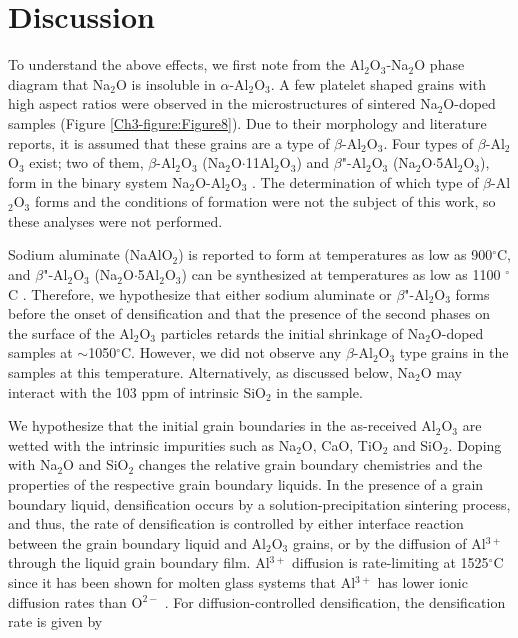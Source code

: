 \section{Discussion}

To understand the above effects, we first note from the Al$_{2}$O$_{3}$-Na$_{2}$O phase diagram \cite{Lambotte2013} that Na$_{2}$O is insoluble in $\alpha$-Al$_{2}$O$_{3}$. A few platelet shaped grains with high aspect ratios were observed in the microstructures of sintered Na$_{2}$O-doped samples (Figure \ref{Ch3-figure:Figure8}). Due to their morphology and literature reports,\cite{Brownmiller1932,PABLOGALAN1959,Rankin1916,Ridgway1936,Duncan1969} it is assumed that these grains are a type of $\beta$-Al$_{2}$O$_{3}$. Four types of $\beta$-Al$_{2}$O$_{3}$ exist; two of them, $\beta$-Al$_{2}$O$_{3}$ (Na$_{2}$O$\cdot$11Al$_{2}$O$_{3}$) and $\beta$"-Al$_{2}$O$_{3}$ (Na$_{2}$O$\cdot$5Al$_{2}$O$_{3}$), form in the binary system Na$_{2}$O-Al$_{2}$O$_{3}$ \cite{Sutorik1998,Stevens1984}. The determination of which type of $\beta$-Al$_{2}$O$_{3}$ forms and the conditions of formation were not the subject of this work, so these analyses were not performed.

Sodium aluminate (NaAlO$_{2}$) is reported to form at temperatures as low as 900$^{\circ}$C,\cite{Christie1978} and $\beta$"-Al$_{2}$O$_{3}$ (Na$_{2}$O$\cdot$5Al$_{2}$O$_{3}$) can be synthesized at temperatures as low as 1100 $^{\circ}$C \cite{Brownmiller1932,Kummer1972,Vries1969}. Therefore, we hypothesize that either sodium aluminate or $\beta$"-Al$_{2}$O$_{3}$ forms before the onset of densification and that the presence of the second phases on the surface of the Al$_{2}$O$_{3}$ particles retards the initial shrinkage of Na$_{2}$O-doped samples at $\sim$1050$^{\circ}$C.  However, we did not observe any $\beta$-Al$_{2}$O$_{3}$ type grains in the samples at this temperature. Alternatively, as discussed below, Na$_{2}$O may interact with the 103 ppm of intrinsic SiO$_{2}$ in the sample.

We hypothesize that the initial grain boundaries in the as-received Al$_{2}$O$_{3}$ are wetted with the intrinsic impurities such as Na$_{2}$O, CaO, TiO$_{2}$ and SiO$_{2}$. Doping with Na$_{2}$O and SiO$_{2}$ changes the relative grain boundary chemistries and the properties of the respective grain boundary liquids. In the presence of a grain boundary liquid, densification occurs by a solution-precipitation sintering process, and thus, the rate of densification is controlled by either interface reaction between the grain boundary liquid and Al$_{2}$O$_{3}$ grains, or by the diffusion of Al$^{3+}$ through the liquid grain boundary film. Al$^{3+}$ diffusion is rate-limiting at 1525$^{\circ}$C since it has been shown for molten glass systems that Al$^{3+}$ has lower ionic diffusion rates than O$^{2-}$ \cite{Terai1975}. For diffusion-controlled densification, the densification rate is given by \cite{Kwon1990,Kwon1991}

